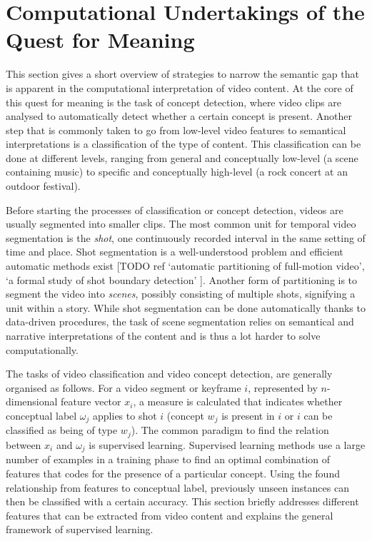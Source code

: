 \section{Computational Undertakings of the Quest for Meaning}

This section gives a short overview of strategies to narrow the semantic gap that is apparent in the computational interpretation of video content. At the core of this quest for meaning is the task of concept detection\cite{Snoek:2009dq}, where video clips are analysed to automatically detect whether a certain concept is present. Another step that is commonly taken to go from low-level video features to semantical interpretations is a classification of the type of content. This classification can be done at different levels, ranging from general and conceptually low-level (a scene containing music) to specific and conceptually high-level (a rock concert at an outdoor festival)\cite{Wang:2000vf}.

Before starting the processes of classification or concept detection, videos are usually segmented into smaller clips. The most common unit for temporal video segmentation is the \emph{shot}, one continuously recorded interval in the same setting of time and place. Shot segmentation is a well-understood problem and efficient automatic methods exist [TODO ref `automatic partitioning of full-motion video', `a formal study of shot boundary detection' ]. Another form of partitioning is to segment the video into \emph{scenes}, possibly consisting of multiple shots, signifying a unit within a story\cite{Wang:2000vf}. While shot segmentation can be done automatically thanks to data-driven procedures, the task of scene segmentation relies on semantical and narrative interpretations of the content and is thus a lot harder to solve computationally.

The tasks of video classification and video concept detection, are generally organised as follows. For a video segment or keyframe $i$, represented by $n$-dimensional feature vector $x_i$, a measure is calculated that indicates whether conceptual label $\omega_j$ applies to shot $i$ (concept $w_j$ is present in $i$ or  $i$ can be classified as being of type $w_j$). The common paradigm to find the relation between $x_i$ and $\omega_j$ is supervised learning. Supervised learning methods use a large number of examples in a training phase to find an optimal combination of features that codes for the presence of a particular concept. Using the found relationship from features to conceptual label, previously unseen instances can then be classified with a certain accuracy. This section briefly addresses different features that can be extracted from video content and explains the general framework of supervised learning.

